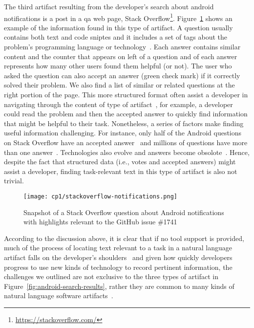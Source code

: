 The third artifact resulting from the developer's search 
about android notifications 
is a post in a \acf{qa} web page, Stack Overflow\footnote{\url{https://stackoverflow.com/}}.
Figure~\ref{fig:qa-notification-icon} shows an example of the information found in this type of artifact.
A question usually contains both text and code sniptes
and it includes a set of tags  about the
problem's programming language or technology~\cite{Treude2011a}. 
Each answer contains similar content and 
the counter that appears on left of a question and of each answer
represents how many other users found them helpful (or not).
The user who asked the question can also accept an answer (green check mark)
if it correctly solved their problem.
We also find a list of similar or related questions 
at the right portion of the page. 
This more structured format often assist a developer 
in navigating through the content of type of artifact~\cite{nadi2020}, for example, a developer could read the problem and 
then the accepted answer to quickly find information that might be helpful 
to their task. Nonetheless, a series of factors make finding useful information challenging. 
For instance, only half of the Android questions on Stack Overflow
have an accepted answer~\cite{parnin2012} 
and millions of questions have more than one answer~\cite{nadi2020}.
Technologies also evolve and answers become obsolote~\cite{Allamanis2013}.
Hence, despite the fact that structured data (i.e., votes and accepted answers) might 
assist a developer, finding task-relevant text in this type of artifact is also not 
trivial.




\begin{figure}
    \centering
    \texttt{[image: cp1/stackoverflow-notifications.png]}
    \caption{Snapshot of a Stack Overflow question about Android notifications  with highlights relevant to the GitHub issue \#1741}
    \label{fig:qa-notification-icon}
\end{figure}



According to the discussion above, it is clear that if no tool support is provided, much of the process of locating text 
relevant to a task in a natural language artifact falls on the developer's shoulders~\cite{gonccalves2011, Ko2006a, Bystrom1995} and given how quickly developers progress to use new kinds of technology to
record pertinent information, the challenges we outlined are not exclusive 
to the three types of artifact in Figure~\ref{fig:android-search-results}, rather 
they are common to many kinds of natural language software artifacts~\cite{Li2013, Starke2009}.




